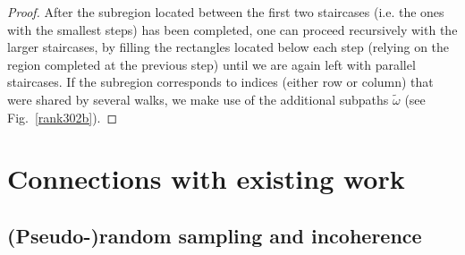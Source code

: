 \documentclass[12pt]{article}
\begin{document}
\begin{proof}
After the subregion located between the first two staircases (i.e. the ones with the smallest steps) has been completed, one can proceed recursively with the larger staircases, by filling the rectangles located below each step (relying on the region completed at the previous step) until we are again left with parallel staircases.  If the subregion corresponds to indices (either row or column) that were shared by several walks, we make use of the additional subpaths $\tilde{\omega}$ (see Fig.~\ref{rank302b}). 

\end{proof}


\section{Connections with existing work}

\subsection{\label{pseudoRandomSchemes}(Pseudo-)random sampling and incoherence }
\end{document}
